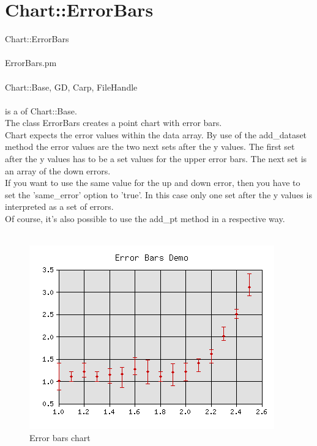 \section{Chart::ErrorBars}
 Chart::ErrorBars\\ \\
 ErrorBars.pm\\ \\
Chart::Base, GD, Carp, FileHandle\\ \\
  is a  of Chart::Base.\\
The class ErrorBars creates a point chart with error bars.\\
Chart expects the error values within the data array. By use of the add\_dataset method the error values are the two next sets after the y values. The first set after the y values has to be a set values for the upper error bars. The next set is an array of the down errors.\\
If you want to use the same value for the up and down error, then you have to set the 'same\_error' option to 'true'. In this case only one set after the y values is interpreted as a set of errors.\\
Of course, it's also possible to use the add\_pt method in a respective way.\\
\\  
\begin{figure}[h]
	\begin{center}
		\includegraphics[scale=0.7]{error.png}
	\end{center}
	\caption{Error bars chart}
	\label{fig:error}
\end{figure}
